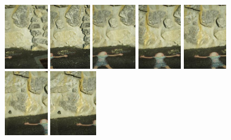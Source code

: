 \begin{figure}[H]
\begin{center}
\includegraphics[height=28mm]{FIGS/MurSaintMartin/Small-IMGP4167.JPG}
\includegraphics[height=28mm]{FIGS/MurSaintMartin/Small-IMGP4168.JPG}
\includegraphics[height=28mm]{FIGS/MurSaintMartin/Small-IMGP4169.JPG}
\includegraphics[height=28mm]{FIGS/MurSaintMartin/Small-IMGP4170.JPG}
\includegraphics[height=28mm]{FIGS/MurSaintMartin/Small-IMGP4171.JPG}
\includegraphics[height=28mm]{FIGS/MurSaintMartin/Small-IMGP4172.JPG}
\includegraphics[height=28mm]{FIGS/MurSaintMartin/Small-IMGP4173.JPG}

\end{center}
\end{figure}
